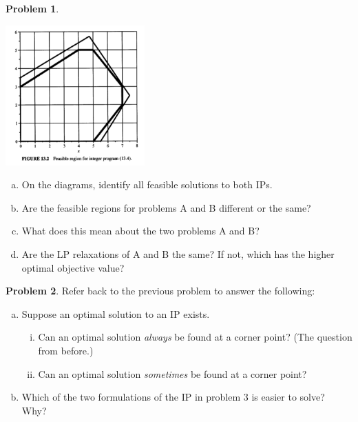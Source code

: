 \documentclass[11pt]{article}
\theoremstyle{definition}
\newtheorem{problem}{Problem}
\newcommand{\answerbox}[3]{%
  \fbox{%
    \begin{minipage}[#1]{#2}
      \hfill\vspace{#3}
    \end{minipage}
  }
}
\newcommand{\answerboxone}[2]{%
  \answerbox{#1}{6.0in}{#2} 
}
\newcommand{\answerboxtwo}[2]{%
  \answerbox{#1}{5.8in}{#2}
}
\newcommand{\wordbox}{\answerbox{c}{1.2in}{.7cm}}
\begin{document}
\begin{problem}
\begin{multicols}{2}
\includegraphics[width = 0.4\textwidth]{formulation_ideal}
\end{multicols}


\begin{enumerate}[(a)]
   \item On the diagrams, identify all feasible solutions to both IPs. 
   \item Are the feasible regions for problems A and B different or the same?  \wordbox
   \item What does this mean about the two problems A and B? 
   
   \answerboxone{c}{.6in}
   \item Are the LP relaxations of A and B the same?  If not, which has the higher optimal objective value?
   
   \answerboxone{c}{.5in}
\end{enumerate}
\end{problem}


\newpage

\begin{problem}
Refer back to the previous problem to answer the following:
\begin{enumerate}[(a)]
\item  Suppose an optimal solution to an IP exists.
\begin{enumerate}[i.]
\item Can an optimal solution \emph{always} be found at a corner point?  (The question from before.)

\answerboxtwo{c}{.5in}

\item Can an optimal solution \emph{sometimes} be found at a corner point?  
 
\answerboxtwo{c}{.5in}
\end{enumerate}
\item Which of the two formulations of the IP in problem 3 is easier to solve?  Why?

\answerboxone{c}{1in}

\end{enumerate}
\end{problem}
\end{document}
